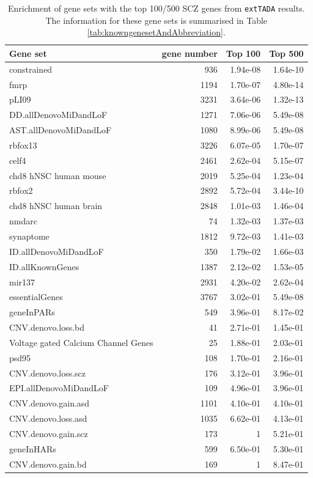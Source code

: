 \documentclass[]{article}
\begin{document}
\begin{table}[H]
\small
\begin{tabular}{|l|rrr|}
\hline
Gene set & gene number & Top 100 & Top 500 \\
\hline
constrained & 936 & 1.94e-08 & 1.64e-10\\
fmrp & 1194 & 1.70e-07 & 4.80e-14\\
pLI09 & 3231 & 3.64e-06 & 1.32e-13\\
DD.allDenovoMiDandLoF & 1271 & 7.06e-06 & 5.49e-08\\
AST.allDenovoMiDandLoF & 1080 & 8.99e-06 & 5.49e-08\\
rbfox13 & 3226 & 6.07e-05 & 1.70e-07\\
celf4 & 2461 & 2.62e-04 & 5.15e-07\\
chd8 hNSC human mouse & 2019 & 5.25e-04 & 1.23e-04\\
rbfox2 & 2892 & 5.72e-04 & 3.44e-10\\
chd8 hNSC human brain & 2848 & 1.01e-03 & 1.46e-04\\
nmdarc & 74 & 1.32e-03 & 1.37e-03\\
synaptome & 1812 & 9.72e-03 & 1.41e-03\\
ID.allDenovoMiDandLoF & 350 & 1.79e-02 & 1.66e-03\\
ID.allKnownGenes & 1387 & 2.12e-02 & 1.53e-05\\
mir137 & 2931 & 4.20e-02 & 2.62e-04\\
essentialGenes & 3767 & 3.02e-01 & 5.49e-08\\
geneInPARs & 549 & 3.96e-01 & 8.17e-02\\
CNV.denovo.loss.bd & 41 & 2.71e-01 & 1.45e-01\\
Voltage gated Calcium Channel Genes & 25 & 1.88e-01 & 2.03e-01\\
psd95 & 108 & 1.70e-01 & 2.16e-01\\
CNV.denovo.loss.scz & 176 & 3.12e-01 & 3.96e-01\\
EPI.allDenovoMiDandLoF & 109 & 4.96e-01 & 3.96e-01\\
CNV.denovo.gain.asd & 1101 & 4.10e-01 & 4.10e-01\\
CNV.denovo.loss.asd & 1035 & 6.62e-01 & 4.13e-01\\
CNV.denovo.gain.scz & 173 & 1 & 5.21e-01\\
geneInHARs & 599 & 6.50e-01 & 5.30e-01\\
CNV.denovo.gain.bd & 169 & 1 & 8.47e-01\\

\hline
\end{tabular}
\caption{Enrichment of gene sets with the top 100/500 SCZ genes from
  \texttt{extTADA} results. The information for these gene sets is
  summarised in Table \ref{tab:knowngenesetAndAbbreviation}.}
\label{tab:enrichmentGeneSet}
\end{table}
\end{document}
